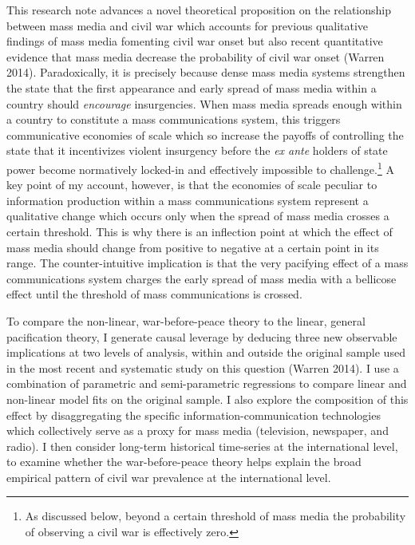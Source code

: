 \documentclass[11pt,article,oneside]{memoir}
\begin{document}
This research note advances a novel theoretical proposition on the
relationship between mass media and civil war which accounts for
previous qualitative findings of mass media fomenting civil war onset
but also recent quantitative evidence that mass media decrease the
probability of civil war onset (Warren 2014). Paradoxically, it is
precisely because dense mass media systems strengthen the state that the
first appearance and early spread of mass media within a country should
\emph{encourage} insurgencies. When mass media spreads enough within a
country to constitute a mass communications system, this triggers
communicative economies of scale which so increase the payoffs of
controlling the state that it incentivizes violent insurgency before the
\emph{ex ante} holders of state power become normatively locked-in and
effectively impossible to challenge.\footnote{As discussed below, beyond
  a certain threshold of mass media the probability of observing a civil
  war is effectively zero.} A key point of my account, however, is that
the economies of scale peculiar to information production within a mass
communications system represent a qualitative change which occurs only
when the spread of mass media crosses a certain threshold. This is why
there is an inflection point at which the effect of mass media should
change from positive to negative at a certain point in its range. The
counter-intuitive implication is that the very pacifying effect of a
mass communications system charges the early spread of mass media with a
bellicose effect until the threshold of mass communications is crossed.

To compare the non-linear, war-before-peace theory to the linear,
general pacification theory, I generate causal leverage by deducing
three new observable implications at two levels of analysis, within and
outside the original sample used in the most recent and systematic study
on this question (Warren 2014). I use a combination of parametric and
semi-parametric regressions to compare linear and non-linear model fits
on the original sample. I also explore the composition of this effect by
disaggregating the specific information-communication technologies which
collectively serve as a proxy for mass media (television, newspaper, and
radio). I then consider long-term historical time-series at the
international level, to examine whether the war-before-peace theory
helps explain the broad empirical pattern of civil war prevalence at the
international level.
\end{document}

